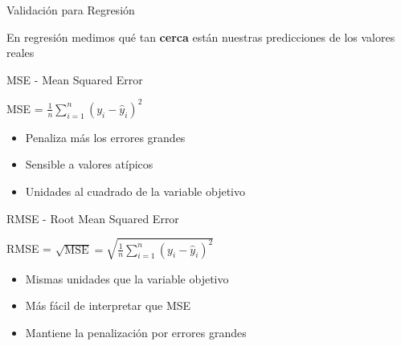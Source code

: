 \documentclass{beamer}
\begin{document}
\begin{frame}{Validación para Regresión}
    \begin{center}
        \Large En regresión medimos qué tan \textbf{cerca} están nuestras predicciones de los valores reales
    \end{center}
    
    \vspace{1em}
    
    \begin{itemize}
    \end{itemize}
\end{frame}

\begin{frame}{MSE - Mean Squared Error}
    \begin{center}
        \Large MSE = $\frac{1}{n} \sum_{i=1}^{n} {(y_i - \hat{y}_i)}^2$
    \end{center}
    
    \begin{itemize}
        \item Penaliza más los errores grandes
        \item Sensible a valores atípicos
        \item Unidades al cuadrado de la variable objetivo
    \end{itemize}
\end{frame}

\begin{frame}{RMSE - Root Mean Squared Error}
    \begin{center}
        \Large RMSE = $\sqrt{\text{MSE}} = \sqrt{\frac{1}{n} \sum_{i=1}^{n} {(y_i - \hat{y}_i)}^2}$
    \end{center}
    
    \begin{itemize}
        \item Mismas unidades que la variable objetivo
        \item Más fácil de interpretar que MSE
        \item Mantiene la penalización por errores grandes
    \end{itemize}
\end{frame}
\end{document}
